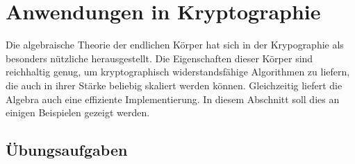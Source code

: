 %
%
%
\chapter{Anwendungen in Kryptographie
\label{buch:chapter:kryptographie}}
\rhead{}
Die algebraische Theorie der endlichen Körper hat sich
in der Krypographie als besonders nützliche herausgestellt.
Die Eigenschaften dieser Körper sind reichhaltig genug, um 
kryptographisch widerstandsfähige Algorithmen zu liefern, die
auch in ihrer Stärke beliebig skaliert werden können.
Gleichzeitig liefert die Algebra auch eine effiziente Implementierung.
In diesem Abschnitt soll dies an einigen Beispielen gezeigt werden.





%

\section*{Übungsaufgaben}
\begin{uebungsaufgaben}
\end{uebungsaufgaben}

